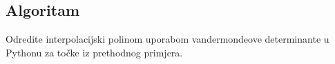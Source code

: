 \pagebreak

\subsection{Algoritam}

\begin{example}
    Odredite interpolacijski polinom uporabom vandermondeove determinante u
    Pythonu za točke iz prethodnog primjera.
\end{example}


